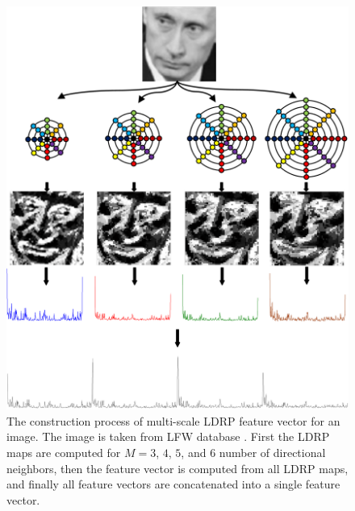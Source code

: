 \documentclass[a4paper]{article}
\begin{document}
\begin{figure}[!t]
    \centering
    \includegraphics[width=.99\linewidth]{3.png}
    \caption{The construction process of multi-scale LDRP feature vector for an image. The image is taken from LFW database \cite{lfw}. First the LDRP maps are computed for $M=3$, $4$, $5$, and $6$ number of directional neighbors, then the feature vector is computed from all LDRP maps, and finally all feature vectors are concatenated into a single feature vector.}
    \label{fig:multiscale}
\end{figure}
\end{document}
